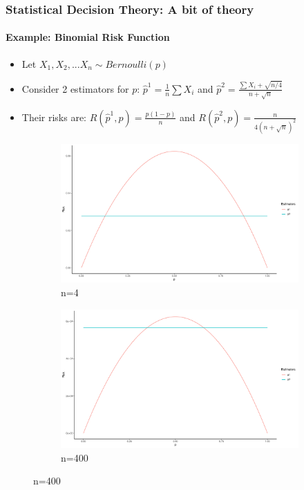 \documentclass[
  shownotes,
  xcolor={svgnames},
  hyperref={colorlinks,citecolor=DarkBlue,linkcolor=DarkRed,urlcolor=DarkBlue}
  , aspectratio=169]{beamer}
\begin{document}
\begin{frame}
\frametitle{Statistical Decision Theory: A bit of theory}
\framesubtitle{Example: Binomial Risk Function}

\begin{itemize}
  \footnotesize
  \item Let $X_1,X_2,...X_n \sim Bernoulli(p)$
  \item Consider 2 estimators for $p$:  $\hat{p}^1=\frac{1}{n}\sum X_i$ and $\hat{p}^2=\frac{\sum X_i + \sqrt{n/4}}{n+\sqrt{n}}$
  \item Their risks are: $R(\hat{p}^1,p)=\frac{p(1-p)}{n}$ and $R(\hat{p}^2,p)=\frac{n}{4(n+\sqrt{n})^2}$
\end{itemize}


\begin{figure}
\centering
\begin{subfigure}{.5\textwidth}
  \centering
  \includegraphics[scale=0.23]{figures/fig_2a.pdf}
  \caption{n=4}
\end{subfigure}%
\begin{subfigure}{.5\textwidth}
  \centering
  \includegraphics[scale=0.23]{figures/fig_2b.pdf}
  \caption{n=400}
\end{subfigure}
\end{figure}



\end{frame}
\end{document}
